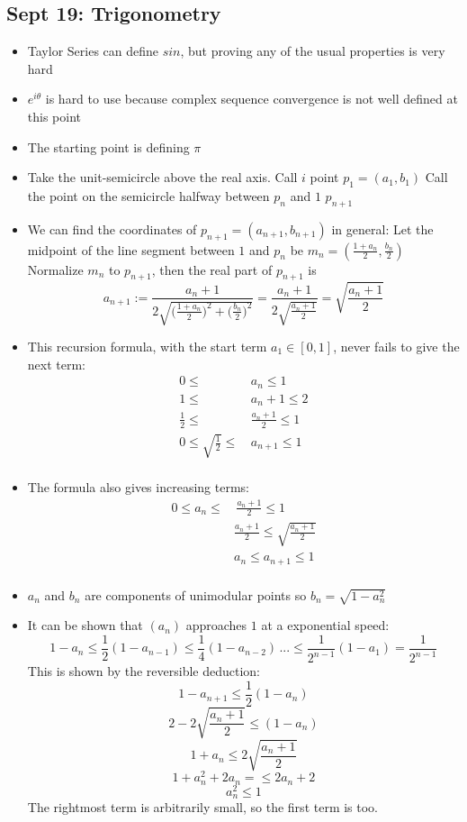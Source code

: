 \documentclass[10pt, oneside]{article}
\let\leq\leqslant
\begin{document}
\subsection{Sept 19: Trigonometry}
\begin{itemize}
    \item Taylor Series can define $sin$, but proving any of the usual properties is very hard
    \item $e^{i\theta}$ is hard to use because complex sequence convergence is not well defined at this point
    \item The starting point is defining $\pi$
    \item Take the unit-semicircle above the real axis.
        Call $i$ point $p_1 = (a_1 , b_1)$
        Call the point on the semicircle halfway between $p_n$ and $1$ $p_{n+1}$
    \item We can find the coordinates of $p_{n+1} = (a_{n+1}, b_{n+1})$ in general:
        Let the midpoint of the line segment between $1$ and $p_n$ be $m_n = (\frac{1 + a_n}{2},\frac{b_n}{2})$
        Normalize $m_n$ to $p_{n+1}$, then the real part of $p_{n+1}$ is 
        \[a_{n+1} := \frac{a_n + 1}{2 \sqrt{\big( \frac{1+a_n}{2} \big) ^2 + \big( \frac{b_n}{2} \big) ^2}} = \frac{a_n + 1}{2 \sqrt{\frac{a_n + 1}{2}}} = \sqrt{\frac{a_n + 1}{2}}\]
    \item This recursion formula, with the start term $a_1 \in [0,1]$, never fails to give the next term:
    \begin{align*}
        0 \leq \, & a_n \leq 1\\
        1 \leq \, & a_n + 1 \leq 2\\
        \frac{1}{2} \leq \, & \frac{a_n + 1}{2} \leq 1\\
        0 \leq \sqrt{\frac{1}{2}} \leq \, & a_{n+1} \leq 1\\
    \end{align*}
    \item The formula also gives increasing terms:
    \begin{align*}
        0 \leq a_n \leq & \, \frac{a_n + 1}{2} \leq 1\\
        & \frac{a_n + 1}{2} \leq \sqrt{\frac{a_n + 1}{2}}\\
        & a_n \leq a_{n+1} \leq 1\\
    \end{align*}
    \item $a_n$ and $b_n$ are components of unimodular points so $b_n = \sqrt{1 - a_n^2}$
    \item It can be shown that $(a_n)$ approaches $1$ at a exponential speed:
        \[1 - a_n \leq \frac{1}{2} (1 - a_{n-1}) \leq \frac{1}{4} (1 - a_{n-2}) \, ... \leq \frac{1}{2^{n-1}} (1 - a_1) = \frac{1}{2^{n-1}}\]
        This is shown by the reversible deduction:
        \[1 - a_{n+1} \leq \frac{1}{2} (1 - a_n)\]
        \[2 - 2 \sqrt{\frac{a_n + 1}{2}} \leq (1 - a_n)\]
        \[1 + a_n \leq 2\sqrt{\frac{a_n + 1}{2}}\]
        \[1 + a_n^2 + 2 a_n =\leq2 a_n + 2\]
        \[a_n^2 \leq 1\]
    The rightmost term is arbitrarily small, so the first term is too.
\end{itemize}
\end{document}
